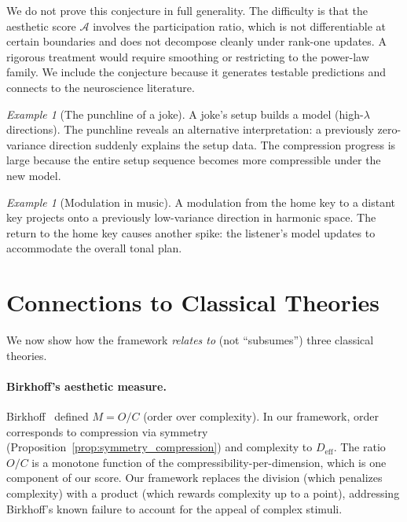 \documentclass[journal]{IEEEtran}
\theoremstyle{definition}
\theoremstyle{remark}
\newtheorem{example}[theorem]{Example}
\begin{document}
We do not prove this conjecture in full generality.  The difficulty
is that the aesthetic score $\mathcal{A}$ involves the participation
ratio, which is not differentiable at certain boundaries and does not
decompose cleanly under rank-one updates.  A rigorous treatment would
require smoothing or restricting to the power-law family.  We include
the conjecture because it generates testable predictions and
connects to the neuroscience literature.

\begin{example}[The punchline of a joke]
A joke's setup builds a model (high-$\lambda$ directions).  The
punchline reveals an alternative interpretation: a previously
zero-variance direction suddenly explains the setup data.  The
compression progress is large because the entire setup sequence
becomes more compressible under the new model.
\end{example}

\begin{example}[Modulation in music]
A modulation from the home key to a distant key projects onto a
previously low-variance direction in harmonic space.  The return
to the home key causes another spike: the listener's model updates
to accommodate the overall tonal plan.
\end{example}


\section{Connections to Classical Theories}
\label{sec:connections}

We now show how the framework \emph{relates to} (not ``subsumes'')
three classical theories.

\paragraph{Birkhoff's aesthetic measure.}
Birkhoff~\cite{birkhoff1933aesthetic} defined $M = O/C$ (order over
complexity).  In our framework, order corresponds to compression via
symmetry (Proposition~\ref{prop:symmetry_compression}) and complexity
to $D_{\mathrm{eff}}$.  The ratio $O/C$ is a monotone function of
the compressibility-per-dimension, which is one component of our
score.  Our framework replaces the division (which penalizes
complexity) with a product (which rewards complexity up to a point),
addressing Birkhoff's known failure to account for the appeal of
complex stimuli.
\end{document}
